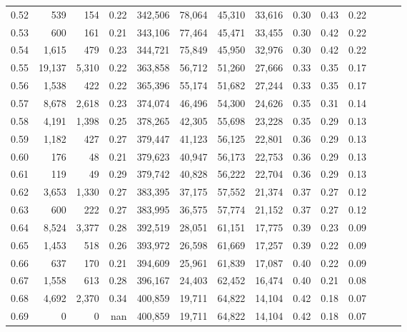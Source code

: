 \begin{tabular}{rrrrrrrrrrrrrr}
0.52 &     539 &    154 &  0.22 &  342,506 &   78,064 &  45,310 &  33,616 &  0.30 &  0.43 &      0.22 \\
0.53 &     600 &    161 &  0.21 &  343,106 &   77,464 &  45,471 &  33,455 &  0.30 &  0.42 &      0.22 \\
0.54 &   1,615 &    479 &  0.23 &  344,721 &   75,849 &  45,950 &  32,976 &  0.30 &  0.42 &      0.22 \\
0.55 &  19,137 &  5,310 &  0.22 &  363,858 &   56,712 &  51,260 &  27,666 &  0.33 &  0.35 &      0.17 \\
0.56 &   1,538 &    422 &  0.22 &  365,396 &   55,174 &  51,682 &  27,244 &  0.33 &  0.35 &      0.17 \\
0.57 &   8,678 &  2,618 &  0.23 &  374,074 &   46,496 &  54,300 &  24,626 &  0.35 &  0.31 &      0.14 \\
0.58 &   4,191 &  1,398 &  0.25 &  378,265 &   42,305 &  55,698 &  23,228 &  0.35 &  0.29 &      0.13 \\
0.59 &   1,182 &    427 &  0.27 &  379,447 &   41,123 &  56,125 &  22,801 &  0.36 &  0.29 &      0.13 \\
0.60 &     176 &     48 &  0.21 &  379,623 &   40,947 &  56,173 &  22,753 &  0.36 &  0.29 &      0.13 \\
0.61 &     119 &     49 &  0.29 &  379,742 &   40,828 &  56,222 &  22,704 &  0.36 &  0.29 &      0.13 \\
0.62 &   3,653 &  1,330 &  0.27 &  383,395 &   37,175 &  57,552 &  21,374 &  0.37 &  0.27 &      0.12 \\
0.63 &     600 &    222 &  0.27 &  383,995 &   36,575 &  57,774 &  21,152 &  0.37 &  0.27 &      0.12 \\
0.64 &   8,524 &  3,377 &  0.28 &  392,519 &   28,051 &  61,151 &  17,775 &  0.39 &  0.23 &      0.09 \\
0.65 &   1,453 &    518 &  0.26 &  393,972 &   26,598 &  61,669 &  17,257 &  0.39 &  0.22 &      0.09 \\
0.66 &     637 &    170 &  0.21 &  394,609 &   25,961 &  61,839 &  17,087 &  0.40 &  0.22 &      0.09 \\
0.67 &   1,558 &    613 &  0.28 &  396,167 &   24,403 &  62,452 &  16,474 &  0.40 &  0.21 &      0.08 \\
0.68 &   4,692 &  2,370 &  0.34 &  400,859 &   19,711 &  64,822 &  14,104 &  0.42 &  0.18 &      0.07 \\
0.69 &       0 &      0 &   nan &  400,859 &   19,711 &  64,822 &  14,104 &  0.42 &  0.18 &      0.07 \\

\end{tabular}
